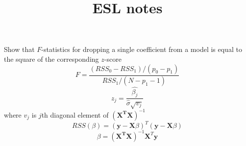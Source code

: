 \documentclass{article}
\title{ESL notes}
\begin{document}
Show that $F$-statistics for dropping a single coeﬃcient from a model is equal to the square of the corresponding $z$-score
$$F=\frac{(RSS_0-RSS_1)/(p_0-p_1)}{RSS_1/(N-p_1-1)}$$
$$ z_j = \frac{\hat{\beta_j} }{\hat{\sigma}\sqrt{v_j} }$$
where $v_j$ is $ j$th diagonal element of $(\mathbf{X^T} \mathbf{X})^{-1}$
$$RSS(\beta)=(\mathbf{y}-\mathbf{X}\beta)^T(\mathbf{y}-\mathbf{X}\beta) $$
\begin{equation}
    \beta = (\mathbf{X^T} \mathbf{X})^{-1}\mathbf{X}^T\mathbf{y}
    \label{eq:}
\end{equation} 
\end{document}
